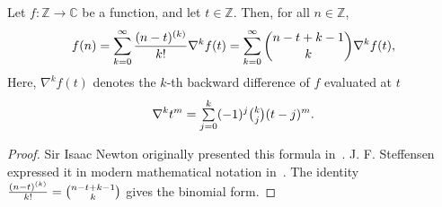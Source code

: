 \begin{lemma}
  \label{lem:backward-newtons-formula}
  Let $f\colon \mathbb{Z} \to \mathbb{C}$ be a function,
  and let $t \in \mathbb{Z}$.
  Then, for all $n \in \mathbb{Z}$,
  \begin{align*}
    f(n)
    = \sum_{k=0}^{\infty} \frac{(n-t)^{\left(k\right)}}{k!} \nabla^{k} f(t)
    = \sum_{k=0}^{\infty} \binom{n-t+k-1}{k} \nabla^{k} f(t),
  \end{align*}
  Here, $\nabla^{k} f(t)$ denotes the $k$-th backward difference of $f$
  evaluated at $t$
  \begin{align*}
    \nabla^{k} t^{m} = \mathop{\textstyle\sum}_{j=0}^{k} (-1)^j \tbinom{k}{j} (t-j)^m.
  \end{align*}
  \begin{proof}
    Sir Isaac Newton originally presented this formula in~\cite{newton1850newton}.
    J. F. Steffensen expressed it in modern mathematical notation in~\cite[Section 2, Equation (19)]{steffensen1927interpolation}.
    The identity
    $\frac{(n-t)^{\left(k\right)}}{k!} = \binom{n-t+k-1}{k}$
    gives the binomial form.
  \end{proof}
\end{lemma}
